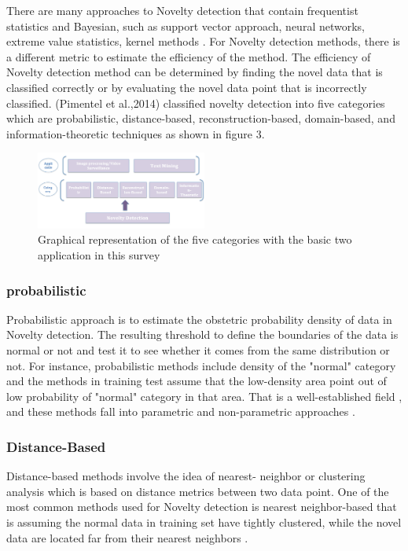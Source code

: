 \documentclass[conference]{IEEEtran}
\begin{document}
There are many approaches to Novelty detection that contain frequentist statistics and Bayesian, such as support vector approach,  neural networks, extreme value statistics, kernel methods \cite{pimentel2014review}. For Novelty detection methods, there is a different metric to estimate the efficiency of the method. The efficiency of Novelty detection method can be determined by finding the novel data that is classified correctly or by evaluating the novel data point that is incorrectly classified.  (Pimentel et al.,2014) classified novelty detection into five categories which are probabilistic, distance-based, reconstruction-based, domain-based,
and information-theoretic techniques \cite{pimentel2014review} as shown in figure 3.


\begin{figure}[h!]
\centering
\includegraphics[width=0.5\textwidth]{33.png}
\caption{\label{} Graphical representation of the five categories with the basic two application in this survey
}
\end{figure}

\subsubsection{probabilistic}

Probabilistic approach is to estimate the obstetric probability density of data in Novelty detection. The resulting threshold to define the boundaries of the data is normal or not and test it to see whether it comes from the same distribution or not. For instance,  probabilistic methods include density of the "normal" category and the methods in training test assume that the low-density area point out of low probability of "normal" category in that area. That is a well-established field \cite{chow1970optimum}, and these methods fall into parametric and non-parametric approaches \cite{pimentel2014review}. 

\subsubsection{Distance-Based}


Distance-based methods involve the idea of nearest- neighbor or clustering analysis which is based on distance metrics between two data point. One of the most common methods used for Novelty detection is nearest neighbor-based that is assuming the normal data in training set have tightly clustered, while the novel data are located far from their nearest neighbors \cite{ismo2004outlier}.
\end{document}
